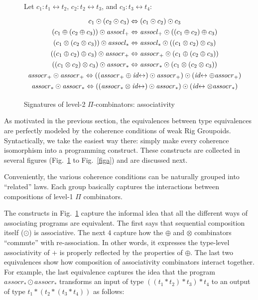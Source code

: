 \documentclass{article}
\newcommand{\assoclp}{\mathit{assocl}_+}
\newcommand{\assocrp}{\mathit{assocr}_+}
\newcommand{\assoclt}{\mathit{assocl}_*}
\newcommand{\assocrt}{\mathit{assocr}_*}
\newcommand{\idc}{\mathit{id}\!\!\leftrightarrow}
\begin{document}
\begin{figure}[tb]
Let $c_1 : t_1 \leftrightarrow t_2$,  $c_2 : t_2 \leftrightarrow t_3$, and $c_3 : t_3 \leftrightarrow t_4$:
\[\def\arraystretch{1.3}
\begin{array}{c}
  {c_1 \odot (c_2 \odot c_3) \Leftrightarrow (c_1 \odot c_2) \odot c_3}
\\
  {(c_1 \oplus (c_2 \oplus c_3)) \odot \assoclp \Leftrightarrow \assoclp \odot ((c_1 \oplus c_2) \oplus c_3)}
\\
  {(c_1 \otimes (c_2 \otimes c_3)) \odot \assoclt \Leftrightarrow \assoclt \odot ((c_1 \otimes c_2) \otimes c_3)}
\\
  {((c_1 \oplus c_2) \oplus c_3) \odot \assocrp \Leftrightarrow \assocrp \odot (c_1 \oplus (c_2 \oplus c_3))}
\\
  {((c_1 \otimes c_2) \otimes c_3) \odot \assocrt \Leftrightarrow \assocrt \odot (c_1 \otimes (c_2 \otimes c_3))}
\\
  {\assocrp \odot \assocrp \Leftrightarrow ((\assocrp \oplus \idc) \odot \assocrp) \odot (\idc \oplus \assocrp)}
\\
  {\assocrt \odot \assocrt \Leftrightarrow ((\assocrt \otimes \idc) \odot \assocrt) \odot (\idc \otimes \assocrt)}
\end{array}\]
\caption{\label{figj}Signatures of level-2 $\Pi$-combinators: associativity}
\end{figure}

As motivated in the previous section, the equivalences between type
equivalences are perfectly modeled by the coherence conditions of weak
Rig Groupoids. Syntactically, we take the easiest way there: simply
make every coherence isomorphism into a programming construct. These
constructs are collected in several figures (Fig.~\ref{figj} to
Fig.~\ref{figa}) and are discussed next.

Conveniently, the various coherence conditions can be naturally
grouped into ``related'' laws.  Each group basically captures the
interactions between compositions of level-1 $\Pi$ combinators.

The constructs in Fig.~\ref{figj} capture the informal idea that all
the different ways of associating programs are equivalent. The first
says that sequential composition itself ($\odot$) is associative.
The next $4$ capture how
the $\oplus$ and $\otimes$ combinators ``commute'' with re-association.
In other words, it expresses the type-level associativity of $+$ is
properly reflected by the properties of $\oplus$.
The last two equivalences show how composition of associativity combinators
interact together. For example, the last equivalence captures the idea that the
program $\assocrt \odot \assocrt$ transforms an input of
type $((t_1 * t_2) * t_3) * t_4$ to an output of type
$t_1 * (t_2 * (t_3 * t_4))$ as follows:
\end{document}
